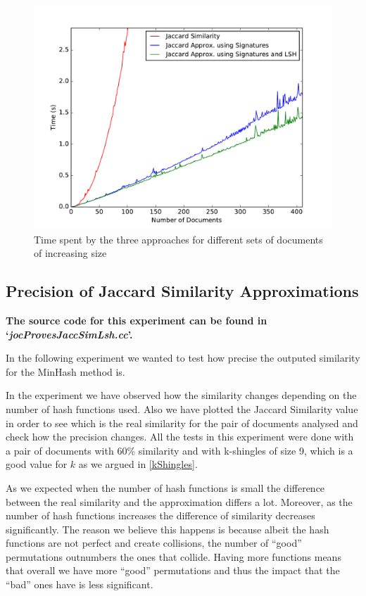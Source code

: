 \documentclass[12pt]{article}
\begin{document}
{\begin{figure}[H]
	\centering
	\includegraphics[scale=0.55]{graphs/JaccardSignatureLSHTimes.pdf}
	\caption{Time spent by the three approaches for different sets of documents of increasing size}
	\label{fig:JaccSignLSH}
\end{figure}

\subsection{Precision of Jaccard Similarity Approximations}
\textbf{The source code for this experiment can be found in `\textit{jocProvesJaccSimLsh.cc}'.}
\medskip

In the following experiment we wanted to test how precise the outputed similarity for the MinHash method is. 

\bigskip
In the experiment we have observed how the similarity changes depending on the number of hash functions used. Also we have plotted the Jaccard Similarity value in order to see which is the real similarity for the pair of documents analysed and check how the precision changes. 
All the tests in this experiment were done with a pair of documents with 60\% similarity and with k-shingles of size 9, which is a good value for $k$ as we argued in \autoref{kShingles}. 

\bigskip
As we expected when the number of hash functions is small the difference between the real similarity and the approximation differs a lot. Moreover, as the number of hash functions increases the difference of similarity decreases significantly.  The reason we believe this happens is because albeit the hash functions are not perfect and create collisions, the number of ``good'' permutations outnumbers the ones that collide. Having more functions means that overall we have more ``good'' permutations and thus the impact that the ``bad'' ones have is less significant.


}
\end{document}
